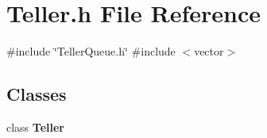 \section{Teller.\+h File Reference}
\label{Teller_8h}
{\ttfamily \#include \char`\"{}Teller\+Queue.\+h\char`\"{}}\newline
{\ttfamily \#include $<$vector$>$}\newline
\subsection*{Classes}
\begin{DoxyCompactItemize}
\item 
class \textbf{ Teller}
\end{DoxyCompactItemize}
